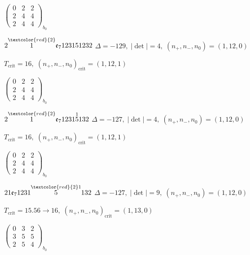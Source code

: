 \documentclass[10pt]{article}
\begin{document}
\hspace{2em}$\left(\begin{smallmatrix}0 & 2 & 2 \\ 2 & 4 & 4 \\ 2 & 4 & 4\end{smallmatrix}\right)_{\!b_0}$

\smallskip

$2\overset{\textcolor{red}{2}}{1}\mathfrak{e}_7123151232$ \quad $\Delta=-129,\; |\det|=4,\; (n_+,n_-,n_0)=(1,12,0)$

\hspace{1em}$T_{\text{crit}}=16,\; (n_+,n_-,n_0)_{\text{crit}}=(1,12,1)$

\hspace{2em}$\left(\begin{smallmatrix}0 & 2 & 2 \\ 2 & 4 & 4 \\ 2 & 4 & 4\end{smallmatrix}\right)_{\!b_0}$

\smallskip

$2\overset{\textcolor{red}{2}}{1}\mathfrak{e}_71231\overset{1}{5}132$ \quad $\Delta=-127,\; |\det|=4,\; (n_+,n_-,n_0)=(1,12,0)$

\hspace{1em}$T_{\text{crit}}=16,\; (n_+,n_-,n_0)_{\text{crit}}=(1,12,1)$

\hspace{2em}$\left(\begin{smallmatrix}0 & 2 & 2 \\ 2 & 4 & 4 \\ 2 & 4 & 4\end{smallmatrix}\right)_{\!b_0}$

$21\mathfrak{e}_71231\overset{\textcolor{red}{2}1}{5}132$ \quad $\Delta=-127,\; |\det|=9,\; (n_+,n_-,n_0)=(1,12,0)$

\hspace{1em}$T_{\text{crit}}=15.56 \to 16,\; (n_+,n_-,n_0)_{\text{crit}}=(1,13,0)$

\hspace{2em}$\left(\begin{smallmatrix}0 & 3 & 2 \\ 3 & 5 & 5 \\ 2 & 5 & 4\end{smallmatrix}\right)_{\!b_0}$

\smallskip
\end{document}
